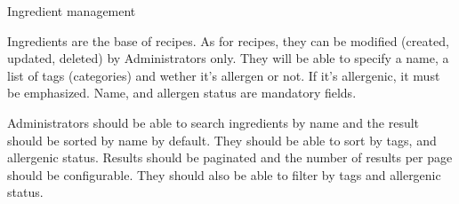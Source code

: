 \usecasedesc
{Ingredient management \label{sec:ingredientManagement}}
{
  Ingredients are the base of recipes. As for recipes, they can be modified (created, updated, deleted) by Administrators only. They will be able to specify a name, a list of tags (categories) and wether it's allergen or not. If it's allergenic, it must be emphasized. Name, and allergen status are mandatory fields.

  Administrators should be able to search ingredients by name and the result should be sorted by name by default. They should be able to sort by tags, and allergenic status. Results should be paginated and the number of results per page should be configurable. They should also be able to filter by tags and allergenic status.

}
